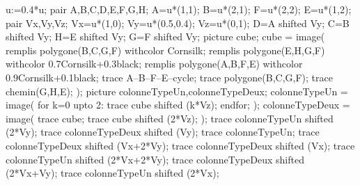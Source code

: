 \begin{exercice*}
\begin{enumerate}
         \begin{Geometrie}
            u:=0.4*u;
            pair A,B,C,D,E,F,G,H;
            A=u*(1,1);
            B=u*(2,1);
            F=u*(2,2);
            E=u*(1,2);
            pair Vx,Vy,Vz;
            Vx=u*(1,0);
            Vy=u*(0.5,0.4);
            Vz=u*(0,1);
            D=A shifted Vy;
            C=B shifted Vy;
            H=E shifted Vy;
            G=F shifted Vy;
            picture cube;
            cube = image(
               remplis polygone(B,C,G,F) withcolor Cornsilk;
               remplis polygone(E,H,G,F) withcolor 0.7Cornsilk+0.3black;
               remplis polygone(A,B,F,E) withcolor 0.9Cornsilk+0.1black;
               trace A--B--F--E--cycle;
               trace polygone(B,C,G,F);
               trace chemin(G,H,E);
            );
            picture colonneTypeUn,colonneTypeDeux;
            colonneTypeUn = image(
            for k=0 upto 2:
               trace cube shifted (k*Vz);
            endfor;
            );
            colonneTypeDeux = image(
            trace cube;
            trace cube shifted (2*Vz);
            );
            trace colonneTypeUn shifted (2*Vy);
            trace colonneTypeDeux shifted (Vy);
            trace colonneTypeUn;
            trace colonneTypeDeux shifted (Vx+2*Vy);
            trace colonneTypeDeux shifted (Vx);
            trace colonneTypeUn shifted (2*Vx+2*Vy);
            trace colonneTypeDeux shifted (2*Vx+Vy);                
            trace colonneTypeUn shifted (2*Vx);                
         \end{Geometrie}
   \end{enumerate}
\end{exercice*}